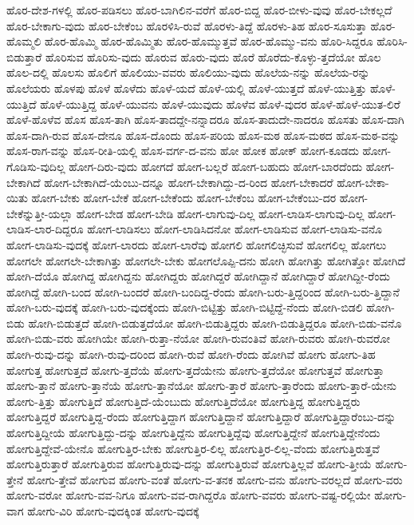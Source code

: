 {ಹೊರ-ದೇಶ-ಗಳಲ್ಲಿ
ಹೊರ-ಪಡಿಸಲು
ಹೊರ-ಬಾಗಿಲಿನ-ವರೆಗೆ
ಹೊರ-ಬಿದ್ದ
ಹೊರ-ಬೀಳು-ವುವು
ಹೊರ-ಬೇಕಲ್ಲದೆ
ಹೊರ-ಬೇಕಾಗು-ವುದು
ಹೊರ-ಬೇಕೆಂಬ
ಹೊರಳಿಸಿ-ರುವೆ
ಹೊರಳು-ತಿದ್ದೆ
ಹೊರಳು-ತಿಹ
ಹೊರ-ಸೂಸುತ್ತಾ
ಹೊರ-ಹೊಮ್ಮಲಿ
ಹೊರ-ಹೊಮ್ಮಿ
ಹೊರ-ಹೊಮ್ಮಿತು
ಹೊರ-ಹೊಮ್ಮುತ್ತವೆ
ಹೊರ-ಹೊಮ್ಮು-ವನು
ಹೊರಿ-ಸಿದ್ದರೂ
ಹೊರಿಸಿ-ಬಿಡುತ್ತಾರೆ
ಹೊರಿಸುವ
ಹೊರಿಸು-ವುದು
ಹೊರುವ
ಹೊರು-ವುದು
ಹೊರೆ
ಹೊರೆದು-ಕೊಳ್ಳು-ತ್ತದೆಯೋ
ಹೊಲ
ಹೊಲ-ದಲ್ಲಿ
ಹೊಲಸು
ಹೊಲಿಗೆ
ಹೊಲಿಯು-ವವರು
ಹೊಲಿಯು-ವುದು
ಹೊಲೆಯ-ನನ್ನು
ಹೊಲೆಯ-ರನ್ನು
ಹೊಲೆಯರು
ಹೊಳಪು
ಹೊಳೆ
ಹೊಳೆದು
ಹೊಳೆ-ಯದೆ
ಹೊಳೆ-ಯಲ್ಲಿ
ಹೊಳೆ-ಯುತ್ತದೆ
ಹೊಳೆ-ಯುತ್ತಿತ್ತು
ಹೊಳೆ-ಯುತ್ತಿದೆ
ಹೊಳೆ-ಯುತ್ತಿದ್ದ
ಹೊಳೆ-ಯುವನು
ಹೊಳೆ-ಯುವುದು
ಹೊಳೆವ
ಹೊಳೆ-ವುದರ
ಹೊಳೆ-ಹೊಳೆ-ಯುತ-ಲಿರೆ
ಹೊಳೆ-ಹೊಳೆವ
ಹೊಸ
ಹೊಸ-ತಾಗಿ
ಹೊಸ-ತಾದದ್ದೇ-ನನ್ನಾದರೂ
ಹೊಸ-ತಾದುದೇ-ನಾದರೂ
ಹೊಸತು
ಹೊಸ-ದಾಗಿ
ಹೊಸ-ದಾಗಿ-ರುವ
ಹೊಸ-ದೇನೂ
ಹೊಸ-ದೊಂದು
ಹೊಸ-ಪರಿಯ
ಹೊಸ-ಮಠ
ಹೊಸ-ಮಠದ
ಹೊಸ-ಮಠ-ವನ್ನು
ಹೊಸ-ರಾಗ-ವನ್ನು
ಹೊಸ-ರೀತಿ-ಯಲ್ಲಿ
ಹೊಸ-ವರ್ಗ-ದ-ವನು
ಹೋ
ಹೋಕ
ಹೋಕ್
ಹೋಗ-ಕೂಡದು
ಹೋಗ-ಗೊಡಿಸು-ವುದಿಲ್ಲ
ಹೋಗ-ದಿರು-ವುದು
ಹೋಗದೆ
ಹೋಗ-ಬಲ್ಲರೆ
ಹೋಗ-ಬಹುದು
ಹೋಗ-ಬಾರದೆಂದು
ಹೋಗ-ಬೇಕಾಗಿದೆ
ಹೋಗ-ಬೇಕಾಗಿದೆ-ಯೆಂಬು-ದನ್ನೂ
ಹೋಗ-ಬೇಕಾಗಿದ್ದು-ದ-ರಿಂದ
ಹೋಗ-ಬೇಕಾದರೆ
ಹೋಗ-ಬೇಕಾ-ಯಿತು
ಹೋಗ-ಬೇಕು
ಹೋಗ-ಬೇಕೆ
ಹೋಗ-ಬೇಕೆಂದು
ಹೋಗ-ಬೇಕೆಂಬ
ಹೋಗ-ಬೇಕೆಂಬು-ದರ
ಹೋಗ-ಬೇಕೆನ್ನುತ್ತೀ-ಯಲ್ಲಾ
ಹೋಗ-ಬೇಡ
ಹೋಗ-ಬೇಡಿ
ಹೋಗ-ಲಾಗುವು-ದಿಲ್ಲ
ಹೋಗ-ಲಾಡಿಸ-ಲಾಗುವು-ದಿಲ್ಲ
ಹೋಗ-ಲಾಡಿಸ-ಲಾರ-ದಿದ್ದರೂ
ಹೋಗ-ಲಾಡಿಸಲು
ಹೋಗ-ಲಾಡಿಸಿದನೋ
ಹೋಗ-ಲಾಡಿಸುವ
ಹೋಗ-ಲಾಡಿಸು-ವನೊ
ಹೋಗ-ಲಾಡಿಸು-ವುದಕ್ಕೆ
ಹೋಗ-ಲಾರದು
ಹೋಗ-ಲಾರೆವು
ಹೋಗಲಿ
ಹೋಗಲಿಚ್ಛಿಸುವೆ
ಹೋಗಲಿಲ್ಲ
ಹೋಗಲು
ಹೋಗಲೇ
ಹೋಗಲೇ-ಬೇಕಾಗಿತ್ತು
ಹೋಗಲೇ-ಬೇಕು
ಹೋಗಲೊಪ್ಪಿ-ದನು
ಹೋಗಿ
ಹೋಗಿತ್ತು
ಹೋಗಿತ್ತೋ
ಹೋಗಿದೆ
ಹೋಗಿ-ದೆಯೊ
ಹೋಗಿದ್ದ
ಹೋಗಿದ್ದನು
ಹೋಗಿದ್ದರು
ಹೋಗಿದ್ದರೆ
ಹೋಗಿದ್ದಾನೆ
ಹೋಗಿದ್ದಾರೆ
ಹೋಗಿದ್ದೀ-ರೆಂದು
ಹೋಗಿದ್ದೆ
ಹೋಗಿ-ಬಂದ
ಹೋಗಿ-ಬಂದರೆ
ಹೋಗಿ-ಬಂದಿದ್ದ-ರೆಂದು
ಹೋಗಿ-ಬರು-ತ್ತಿದ್ದರಿಂದ
ಹೋಗಿ-ಬರು-ತ್ತಿದ್ದಾನೆ
ಹೋಗಿ-ಬರು-ವುದಕ್ಕೆ
ಹೋಗಿ-ಬರು-ವುದಕ್ಕೆಂದು
ಹೋಗಿ-ಬಿಟ್ಟಿತ್ತು
ಹೋಗಿ-ಬಿಟ್ಟಿದ್ದೆ-ನೆಂದು
ಹೋಗಿ-ಬಿಡಲಿ
ಹೋಗಿ-ಬಿಡು
ಹೋಗಿ-ಬಿಡುತ್ತದೆ
ಹೋಗಿ-ಬಿಡುತ್ತದೆಯೋ
ಹೋಗಿ-ಬಿಡುತ್ತಿದ್ದರು
ಹೋಗಿ-ಬಿಡುತ್ತಿದ್ದರೂ
ಹೋಗಿ-ಬಿಡು-ವನೊ
ಹೋಗಿ-ಬಿಡು-ವರು
ಹೋಗಿಯೇ
ಹೋಗಿ-ರುತ್ತಾ-ನೆಯೋ
ಹೋಗಿ-ರುವಂತಿವೆ
ಹೋಗಿ-ರುವರು
ಹೋಗಿ-ರುವರೋ
ಹೋಗಿ-ರುವು-ದನ್ನು
ಹೋಗಿ-ರುವು-ದರಿಂದ
ಹೋಗಿ-ರುವೆ
ಹೋಗಿ-ರೆಂದು
ಹೋಗಿವೆ
ಹೋಗು
ಹೋಗು-ತಿಹ
ಹೋಗುತ್ತ
ಹೋಗುತ್ತದೆ
ಹೋಗು-ತ್ತದೆಯೆ
ಹೋಗು-ತ್ತದೆಯೇನು
ಹೋಗು-ತ್ತದೆಯೋ
ಹೋಗುತ್ತವೆ
ಹೋಗುತ್ತಾ
ಹೋಗು-ತ್ತಾನೆ
ಹೋಗು-ತ್ತಾನೆಯೆ
ಹೋಗು-ತ್ತಾನೆಯೋ
ಹೋಗು-ತ್ತಾರೆ
ಹೋಗು-ತ್ತಾರೆಂದು
ಹೋಗು-ತ್ತಾರೆ-ಯೇನು
ಹೋಗು-ತ್ತಿತ್ತು
ಹೋಗುತ್ತಿದೆ
ಹೋಗುತ್ತಿದೆ-ಯೆಂಬುದು
ಹೋಗುತ್ತಿದೆಯೋ
ಹೋಗುತ್ತಿದ್ದ
ಹೋಗುತ್ತಿದ್ದರು
ಹೋಗುತ್ತಿದ್ದರೆ
ಹೋಗುತ್ತಿದ್ದ-ರೆಂದು
ಹೋಗುತ್ತಿದ್ದಾಗ
ಹೋಗುತ್ತಿದ್ದಾನೆ
ಹೋಗುತ್ತಿದ್ದಾರೆ
ಹೋಗುತ್ತಿದ್ದಾರೆಂಬು-ದನ್ನು
ಹೋಗುತ್ತಿದ್ದೀಯೆ
ಹೋಗುತ್ತಿದ್ದು-ದನ್ನು
ಹೋಗುತ್ತಿದ್ದೆನು
ಹೋಗುತ್ತಿದ್ದೆವು
ಹೋಗುತ್ತಿದ್ದೇನೆ
ಹೋಗುತ್ತಿದ್ದೇನೆಂದು
ಹೋಗುತ್ತಿದ್ದೇವೆ-ಯೇನೊ
ಹೋಗುತ್ತಿರ-ಬೇಕು
ಹೋಗುತ್ತಿರ-ಲಿಲ್ಲ
ಹೋಗುತ್ತಿರ-ಲಿಲ್ಲ-ವೆಂದು
ಹೋಗುತ್ತಿರುತ್ತವೆ
ಹೋಗುತ್ತಿರುತ್ತಾರೆ
ಹೋಗುತ್ತಿರುವ
ಹೋಗುತ್ತಿರುವು-ದನ್ನು
ಹೋಗುತ್ತಿರುವೆ
ಹೋಗುತ್ತಿಲ್ಲವೆ
ಹೋಗು-ತ್ತೀಯೆ
ಹೋಗು-ತ್ತೇನೆ
ಹೋಗು-ತ್ತೇವೆ
ಹೋಗುವ
ಹೋಗು-ವಂತೆ
ಹೋಗು-ವ-ತನಕ
ಹೋಗು-ವನು
ಹೋಗು-ವರಲ್ಲದೆ
ಹೋಗು-ವರು
ಹೋಗು-ವರೋ
ಹೋಗು-ವವ-ನಿಗೂ
ಹೋಗು-ವವ-ರಾಗಿದ್ದರೊ
ಹೋಗು-ವವರು
ಹೋಗು-ವಷ್ಟ-ರಲ್ಲಿಯೇ
ಹೋಗು-ವಾಗ
ಹೋಗು-ವಿರಿ
ಹೋಗು-ವುದಕ್ಕಿಂತ
ಹೋಗು-ವುದಕ್ಕೆ
}
